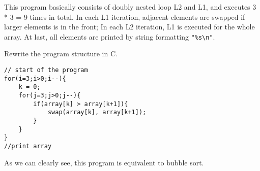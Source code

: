 \documentclass[11pt]{article}
\begin{document}
This program basically consists of doubly nested loop L2 and L1, and executes 3 * 3 = 9 times in total. In each L1 iteration, adjacent elements are swapped if larger elements is in the front; In each L2 iteration, L1 is executed for the whole array. At last, all elements are printed by string formatting \lstinline{"%s\n"}. 

Rewrite the program structure in C.

\begin{lstlisting}[style=CStyle]
// start of the program
for(i=3;i>0;i--){
    k = 0;
    for(j=3;j>0;j--){
        if(array[k] > array[k+1]){
            swap(array[k], array[k+1]);
        }
    }
}
//print array
\end{lstlisting}

As we can clearly see, this program is equivalent to bubble sort.
\end{document}
